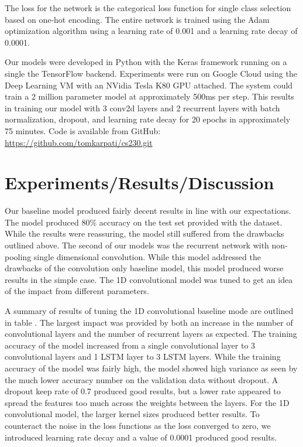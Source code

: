 \documentclass{article}
\begin{document}
The loss for the network is the categorical loss function for single
class selection based on one-hot encoding. The entire network is
trained using the Adam optimization algorithm using a learning rate of
0.001 and a learning rate decay of 0.0001.

Our models were developed in Python with the Keras framework running
on a single the TensorFlow backend. Experiments were run on Google
Cloud using the Deep Learning VM with an NVidia Tesla K80 GPU
attached. The system could train a 2 million parameter model at
approximately 500ms per step. This results in training our model with
3 conv2d layers and 2 recurrent layers with batch normalization,
dropout, and learning rate decay for 20 epochs in approximately 75
minutes. Code is available from GitHub:
\url{https://github.com/tomkarpati/cs230.git}

\section{Experiments/Results/Discussion}
Our baseline model produced fairly decent results in line with our
expectations. The model produced 80\% accuracy on the test set
provided with the dataset. While the results were reassuring, the
model still suffered from the drawbacks outlined above. The second of
our models was the recurrent network with non-pooling single
dimensional convolution. While this model addressed the drawbacks of
the convolution only baseline model, this model produced worse results
in the simple case. The 1D convolutional model was tuned to get an
idea of the impact from different parameters.

A summary of results of tuning the 1D convolutional baseline mode are
outlined in table \cite{tab:summary-results}. The largest impact was
provided by both an increase in the number of convolutional layers and
the number of recurrent layers as expected. The training accuracy of
the model increased from a single convolutional layer to 3
convolutional layers and 1 LSTM layer to 3 LSTM layers. While the
training accuracy of the model was fairly high, the model showed high
variance as seen by the much lower accuracy number on the validation
data without dropout. A dropout keep rate of 0.7
produced good results, but a lower rate appeared to spread the
features too much across the weights between the layers. For the 1D
convolutional model, the larger kernel sizes produced better
results. To counteract the noise in the loss functions
as the loss converged to zero, we introduced learning rate decay and a
value of 0.0001 produced good results.
\end{document}
